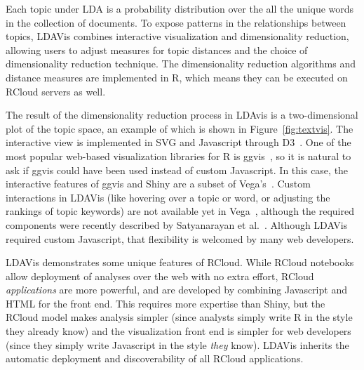 Each topic under LDA is a probability distribution over the all the unique
words in the collection of documents. To expose patterns in the relationships
between topics, LDAVis combines
interactive visualization and dimensionality reduction,
allowing users to adjust measures for topic distances and the choice
of dimensionality reduction technique. The dimensionality reduction
algorithms and distance measures are implemented in R, which
means they can be executed on RCloud servers as well.

The result of the dimensionality reduction process in LDAvis is a
two-dimensional plot of the topic space, an example of which is shown in
Figure~\ref{fig:textvis}. The interactive view is implemented in SVG
and Javascript through D3~\cite{Bostock:2011:DDD}. One of the most
popular web-based visualization libraries for R is ggvis~\cite{ggvis},
so it is natural to ask if ggvis could have been used instead of
custom Javascript. In this case, the interactive features of ggvis
and Shiny are a subset of Vega's~\cite{vega}.
Custom interactions in LDAVis (like hovering over a topic or word, or adjusting the 
rankings of topic keywords) are not available yet in Vega~\cite{vega},
although the required components were recently described by Satyanarayan et
al.~\cite{Satyanarayan:2014:DID}.
Although LDAVis required custom Javascript, that flexibility is welcomed
by many web developers.

LDAVis demonstrates some unique features of RCloud.
While RCloud notebooks allow deployment of analyses over
the web with no extra effort, RCloud \emph{applications} are more
powerful, and are developed by combining Javascript and HTML
for the front end. This requires more expertise than Shiny, but
the RCloud model makes analysis simpler (since analysts
simply write R in the style they already know)
and the visualization front end is simpler for web
developers (since they simply write Javascript in
the style \emph{they} know).
LDAVis inherits the automatic deployment and discoverability
of all RCloud applications.

%
